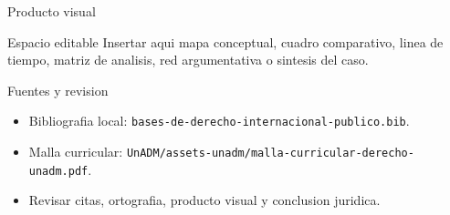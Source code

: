 \documentclass[
  spanish,
  aspectratio=169,
  xcolor={dvipsnames,table}
]{beamer}
\begin{document}
\begin{frame}{Producto visual}
  \begin{block}{Espacio editable}
    Insertar aqui mapa conceptual, cuadro comparativo, linea de tiempo,
    matriz de analisis, red argumentativa o sintesis del caso.
  \end{block}
  \centering
\end{frame}

\begin{frame}{Fuentes y revision}
  \begin{itemize}
    \item Bibliografia local: \texttt{bases-de-derecho-internacional-publico.bib}.
    \item Malla curricular: \texttt{UnADM/assets-unadm/malla-curricular-derecho-unadm.pdf}.
    \item Revisar citas, ortografia, producto visual y conclusion juridica.
  \end{itemize}
\end{frame}
\end{document}
